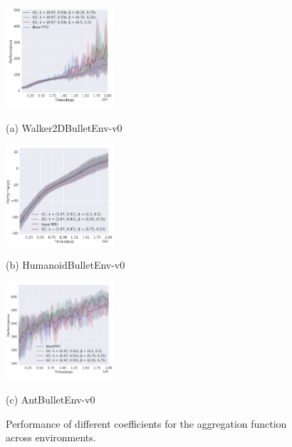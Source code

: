 \begin{figure}[!htb]

\begin{minipage}[b]{.48\linewidth}
  \centering
  \centerline{\includegraphics[width=4.0cm]{images/WalkerCoef}}
  \centerline{(a) Walker2DBulletEnv-v0}\medskip
\end{minipage}
\begin{minipage}[b]{.48\linewidth}
  \centering
  \centerline{\includegraphics[width=4.0cm]{images/HumanoidCoef}}
  \centerline{(b) HumanoidBulletEnv-v0}\medskip
\end{minipage}

%
\begin{minipage}[b]{\linewidth}
  \centering
  \centerline{\includegraphics[width=4.0cm]{images/AntCoef}}
  \centerline{(c) AntBulletEnv-v0}\medskip
\end{minipage}
%
\caption{Performance of different coefficients for the aggregation function across environments.}
\label{fig:res}
%
\end{figure}




